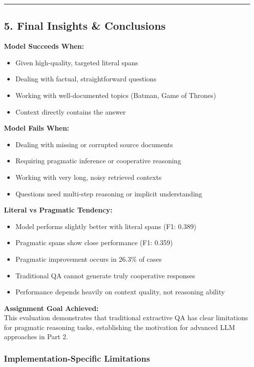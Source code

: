 \documentclass[12pt, letterpaper]{article}
\begin{document}
\bigskip
\hrule
\subsection*{5. Final Insights \& Conclusions}
{}

\noindent \textbf{Model Succeeds When:}
\begin{itemize}
    \item Given high-quality, targeted literal spans
    \item Dealing with factual, straightforward questions
    \item Working with well-documented topics (Batman, Game of Thrones)
    \item Context directly contains the answer
\end{itemize}

\noindent \textbf{Model Fails When:}
\begin{itemize}
    \item Dealing with missing or corrupted source documents
    \item Requiring pragmatic inference or cooperative reasoning
    \item Working with very long, noisy retrieved contexts
    \item Questions need multi-step reasoning or implicit understanding
\end{itemize}

\noindent \textbf{Literal vs Pragmatic Tendency:}
\begin{itemize}
    \item Model performs slightly better with literal spans (F1: 0.389)
    \item Pragmatic spans show close performance (F1: 0.359)
    \item Pragmatic improvement occurs in 26.3\% of cases
    \item Traditional QA cannot generate truly cooperative responses
    \item Performance depends heavily on context quality, not reasoning ability
\end{itemize}

\noindent \textbf{Assignment Goal Achieved:} \\
This evaluation demonstrates that traditional extractive QA has clear limitations for pragmatic reasoning tasks, establishing the motivation for advanced LLM approaches in Part 2.
\subsubsection*{Implementation-Specific Limitations}
{}
\end{document}
